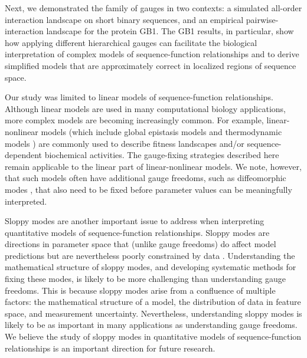 \documentclass[10pt,letterpaper]{article}
\begin{document}
Next, we demonstrated the family of gauges in two contexts: a simulated all-order interaction landscape on short binary sequences, and an empirical pairwise-interaction landscape for the protein GB1.  The GB1 results, in particular, show how applying different hierarchical gauges can facilitate the biological interpretation of complex models of sequence-function relationships and to derive simplified models that are approximately correct in localized regions of sequence space.

Our study was limited to linear models of sequence-function relationships. Although linear models are used in many computational biology applications, more complex models are becoming increasingly common. For example, linear-nonlinear models (which include global epistasis models \cite{Sarkisyan:2016fy, Sailer:2017ku, Otwinowski:2018jj, Tareen:2022dh} and thermodynamic models \cite{Kinney:2010tn, Mogno:2013cf, Otwinowski:2018jb, Belliveau:2018kr, Tareen:2019aa, Faure:2022aa}) are commonly used to describe fitness landscapes and/or sequence-dependent biochemical activities. The gauge-fixing strategies described here remain applicable to the linear part of linear-nonlinear models. We note, however, that such models often have additional gauge freedoms, such as diffeomorphic modes \cite{Kinney:2014ge, Atwal:2015dj}, that also need to be fixed before parameter values can be meaningfully interpreted.

Sloppy modes are another important issue to address when interpreting quantitative models of sequence-function relationships. Sloppy modes are directions in parameter space that (unlike gauge freedoms) do affect model predictions but are nevertheless poorly constrained by data \cite{Machta:2013ga, Transtrum:2015hm}. Understanding the mathematical structure of sloppy modes, and developing systematic methods for fixing these modes, is likely to be more challenging than understanding gauge freedoms. This is because sloppy modes arise from a confluence of multiple factors: the mathematical structure of a model, the distribution of data in feature space, and measurement uncertainty. Nevertheless, understanding sloppy modes is likely to be as important in many applications as understanding gauge freedoms. We believe the study of sloppy modes in quantitative models of sequence-function relationships is an important direction for future research. 
\end{document}
